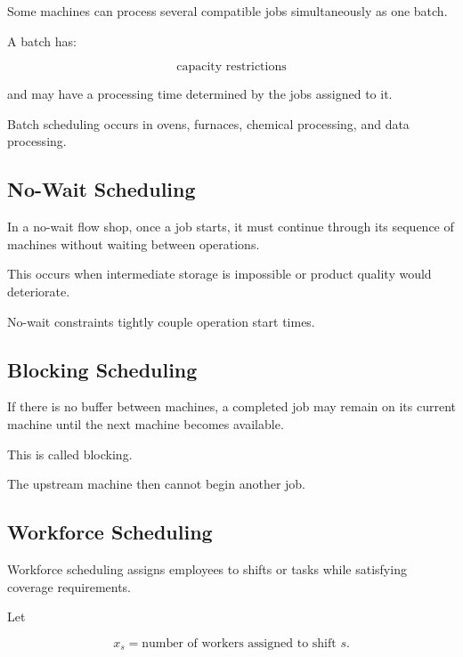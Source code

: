 Some machines can process several compatible jobs simultaneously as one
batch.

A batch has:

\[
\boxed{
\text{capacity restrictions}
}
\]

and may have a processing time determined by the jobs assigned to it.

Batch scheduling occurs in ovens, furnaces, chemical processing, and data
processing.

\subsection{No-Wait Scheduling}
\label{subsec:no-wait-scheduling}

In a no-wait flow shop, once a job starts, it must continue through its
sequence of machines without waiting between operations.

This occurs when intermediate storage is impossible or product quality
would deteriorate.

No-wait constraints tightly couple operation start times.

\subsection{Blocking Scheduling}
\label{subsec:blocking-scheduling}

If there is no buffer between machines, a completed job may remain on its
current machine until the next machine becomes available.

This is called blocking.

The upstream machine then cannot begin another job.

\subsection{Workforce Scheduling}
\label{subsec:workforce-scheduling}

Workforce scheduling assigns employees to shifts or tasks while satisfying
coverage requirements.

Let

\[
x_s
=
\text{number of workers assigned to shift }s.
\]

